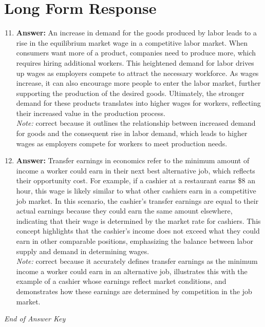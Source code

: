 \documentclass[12pt]{article}
\begin{document}
\section*{Long Form Response}
\begin{enumerate}[label=\arabic*.]
\setcounter{enumi}{10}
\item \textbf{Answer:} An increase in demand for the goods produced by labor leads to a rise in the equilibrium market wage in a competitive labor market. When consumers want more of a product, companies need to produce more, which requires hiring additional workers. This heightened demand for labor drives up wages as employers compete to attract the necessary workforce. As wages increase, it can also encourage more people to enter the labor market, further supporting the production of the desired goods. Ultimately, the stronger demand for these products translates into higher wages for workers, reflecting their increased value in the production process.
\\ \textit{Note:} correct because it outlines the relationship between increased demand for goods and the consequent rise in labor demand, which leads to higher wages as employers compete for workers to meet production needs.
\item \textbf{Answer:} Transfer earnings in economics refer to the minimum amount of income a worker could earn in their next best alternative job, which reflects their opportunity cost. For example, if a cashier at a restaurant earns \$8 an hour, this wage is likely similar to what other cashiers earn in a competitive job market. In this scenario, the cashier's transfer earnings are equal to their actual earnings because they could earn the same amount elsewhere, indicating that their wage is determined by the market rate for cashiers. This concept highlights that the cashier's income does not exceed what they could earn in other comparable positions, emphasizing the balance between labor supply and demand in determining wages.
\\ \textit{Note:} correct because it accurately defines transfer earnings as the minimum income a worker could earn in an alternative job, illustrates this with the example of a cashier whose earnings reflect market conditions, and demonstrates how these earnings are determined by competition in the job market.
\end{enumerate}

\vfill
\noindent\textit{End of Answer Key}
\end{document}
